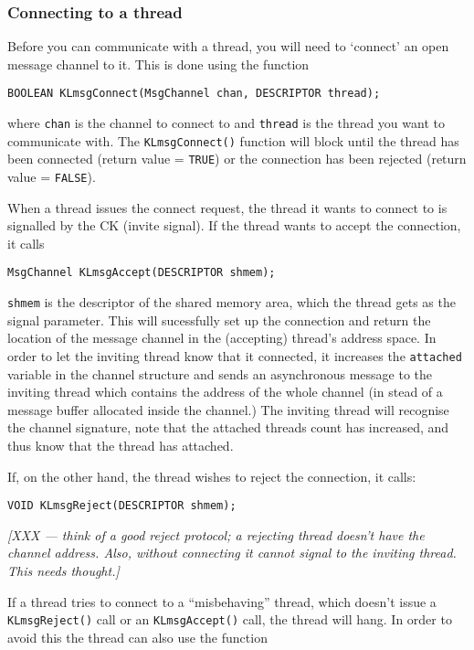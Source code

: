 \documentclass[]{article}
\begin{document}
\subsubsection{Connecting to a thread}

Before you can communicate with a thread, you will need to `connect' an
open message channel to it.  This is done using the function

{\parindent0.6cm\tt BOOLEAN KLmsgConnect(MsgChannel chan, DESCRIPTOR thread);}

where {\tt chan} is the channel to connect to and {\tt thread} is the
thread you want to communicate with.  The {\tt KLmsgConnect()} function
will block until the thread has been connected (return value = {\tt TRUE})
or the connection has been rejected (return value = {\tt FALSE}).

When a thread issues the connect request, the thread it wants to connect
to is signalled by the CK (invite signal).  If the thread wants to accept
the connection, it calls

{\parindent0.6cm\tt MsgChannel KLmsgAccept(DESCRIPTOR shmem);}

{\tt shmem} is the descriptor of the shared memory area, which the thread
gets as the signal parameter.  This will sucessfully set up the connection
and return the location of the message channel in the (accepting) thread's
address space.  In order to let the inviting thread know that it
connected, it increases the {\tt attached} variable in the channel
structure and sends an asynchronous message to the inviting thread which
contains the address of the whole channel (in stead of a message buffer
allocated inside the channel.)  The inviting thread will recognise the
channel signature, note that the attached threads count has increased, and
thus know that the thread has attached.

If, on the other hand, the thread wishes to reject the connection, it
calls:

{\parindent0.6cm\tt VOID KLmsgReject(DESCRIPTOR shmem);}

{\sl [XXX --- think of a good reject protocol; a rejecting thread doesn't
have the channel address.  Also, without connecting it cannot signal to
the inviting thread.  This needs thought.]}

If a thread tries to connect to a ``misbehaving'' thread, which doesn't
issue a {\tt KLmsgReject()} call or an {\tt KLmsgAccept()} call, the
thread will hang.  In order to avoid this the thread can also use the
function
\end{document}
